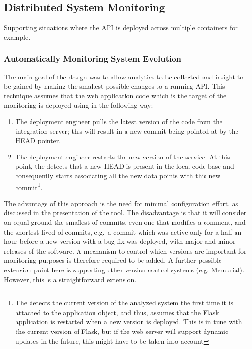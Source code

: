 \documentclass[conference]{IEEEtran}
\begin{document}
  \subsection{Distributed System Monitoring}
  Supporting situations where the API is deployed across multiple containers for example.


  \subsubsection{Automatically Monitoring System Evolution}

  The main goal of the \tool design was to allow analytics to be collected and insight to be gained by making the smallest possible changes to a running API. %
%
  This technique assumes that the web application code which is the target of the monitoring is deployed using \git in the following way: 

  \begin{enumerate}
    \item The deployment engineer pulls the latest version of the code from the integration server; this will result in a new commit being pointed at by the HEAD pointer. %
    \item The deployment engineer restarts the new version of the service. At this point, the \tool detects that a new HEAD is present in the local code base and consequently starts associating all the new data points with this new commit\footnote{The \tool detects the current version of the analyzed system the first time it is attached to the application object, and thus, assumes that the Flask application is restarted when a new version is deployed. This is in tune with the current version of Flask, but if the web server will support dynamic updates in the future, this might have to be taken into account}.
  \end{enumerate}

  The advantage of this approach is the need for minimal configuration effort, as discussed in the presentation of the tool. The disadvantage is that it will consider on equal ground the smallest of commits, even one that modifies a comment, and the shortest lived of commits, e.g.~a commit which was active only for a half an hour before a new version with a bug fix was deployed, with major and minor releases of the software. %
  A mechanism to control which versions are important for monitoring purposes is therefore required to be added.
%
  A further possible extension point here is supporting other version control systems (e.g. Mercurial). However, this is a straightforward extension.
\end{document}
